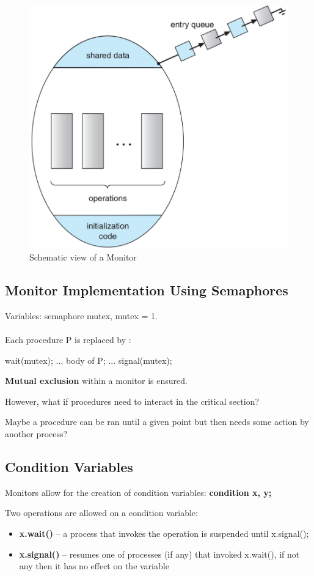 \begin{figure}[htbp]
    \centering
    \includegraphics[width=0.45\linewidth]{img/monitors.png}
    \caption{Schematic view of a Monitor}
\end{figure}


\subsection{Monitor Implementation Using Semaphores}

Variables: semaphore mutex, mutex = 1.
\paragraph{}
Each procedure P is replaced by :

\begin{codeInC}
wait(mutex);
    ...
    body of P;
    ...
signal(mutex);
\end{codeInC}

\textbf{Mutual exclusion} within a monitor is ensured.

However, what if procedures need to interact in the critical section?


Maybe a procedure can be ran until a given point but then needs some
action by another process?

\subsection{Condition Variables}
Monitors allow for the creation of condition variables: \textbf{condition x, y;}

Two operations are allowed on a condition variable:

\begin{itemize}
    \item \textbf{x.wait()} – a process that invokes the operation is suspended until x.signal();
    \item \textbf{x.signal()} – resumes one of processes (if any) that invoked x.wait(), if not any then it has no effect on the variable
\end{itemize}

